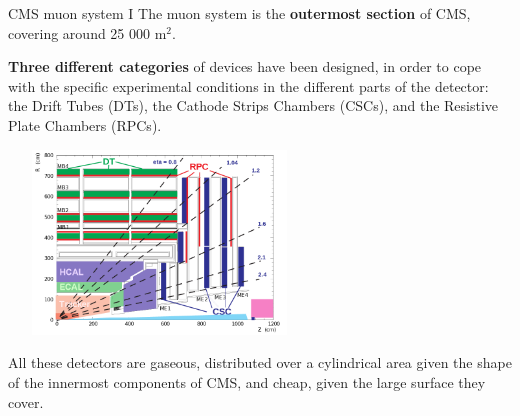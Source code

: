 \documentclass[8pt]{beamer}
\begin{document}
\begin{frame}{CMS muon system I}
\justifying
The \alert{muon system} is the \textbf{outermost section} of CMS, covering around 25 000 m$^2$. \vfill 

\textbf{Three different categories} of devices have been designed, in order to cope with the specific experimental conditions in the different parts of the detector: the Drift Tubes (DTs), the Cathode Strips Chambers (CSCs), and the Resistive Plate Chambers (RPCs). \vfill

\begin{center}
\includegraphics[width=8cm, height=4.9cm]{figs/CMSMuons.png}
\end{center} \vfill

All these detectors are gaseous, distributed over a cylindrical area given the shape of the innermost components of CMS, and cheap, given the large surface they cover. \vfill
\end{frame}
\end{document}
